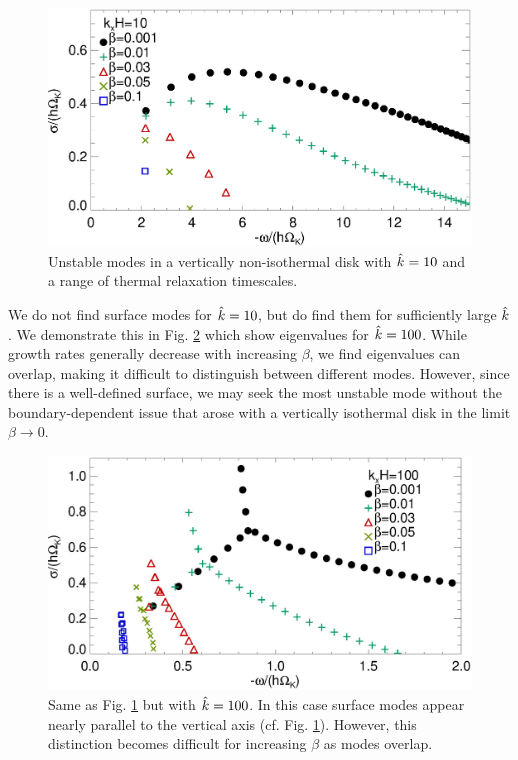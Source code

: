 \begin{figure}
  \includegraphics[width=\linewidth,clip=true,trim=0cm 0cm 0cm
  0cm]{figures/compare_modes_Gam1.084_kx10.ps}
  \caption{Unstable modes in a vertically non-isothermal disk with
    $\hat{k}=10$ and a range of thermal relaxation timescales.  
    \label{compare_modes_vnoniso_kx10}}
\end{figure}

We do not find surface modes for $\hat{k}=10$, but do find them for
sufficiently large $\hat{k}$. We demonstrate this in  %
Fig. \ref{compare_modes_vnoniso_kx100} which show eigenvalues for
$\hat{k}=100$. While growth rates generally decrease with increasing 
$\beta$, we find eigenvalues can overlap, making it difficult to 
distinguish between different modes. However, since there 
is a well-defined surface, we may seek the  
most unstable mode without the boundary-dependent issue that arose 
with a vertically isothermal disk in the limit $\beta\to0$.  

\begin{figure}
  \includegraphics[width=\linewidth,clip=true,trim=0cm 0cm 0cm
  0cm]{figures/compare_modes_Gam1.084_kx100.ps}
  \caption{Same as Fig. \ref{compare_modes_vnoniso_kx10} but with
    $\hat{k}=100$. In this case surface modes appear nearly parallel to
    the vertical axis
    (cf. Fig. \ref{compare_modes_vnoniso_kx10}). However, this
    distinction becomes difficult for increasing $\beta$ as modes
    overlap. 
    \label{compare_modes_vnoniso_kx100}}
\end{figure}

